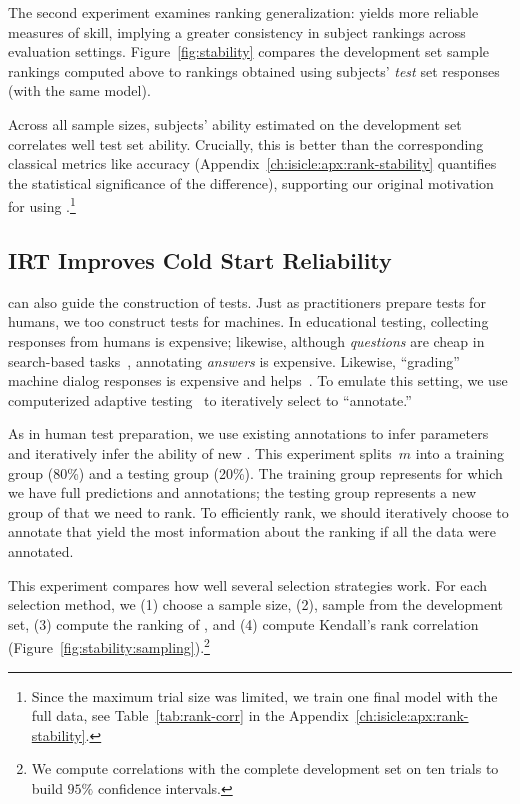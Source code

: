 The second experiment examines ranking generalization: \irt{} yields more reliable measures of \subj{} skill,  implying a greater consistency in subject rankings across evaluation settings.
Figure~\ref{fig:stability} compares the development set sample rankings computed above to rankings obtained using subjects' \emph{test} set responses (with the same \irt{} model).

Across all sample sizes, subjects' \irt{} ability estimated on the
development set correlates well test set ability.
Crucially, this is better than the corresponding classical metrics
like accuracy (Appendix~\ref{ch:isicle:apx:rank-stability} quantifies
the statistical significance of the difference), supporting our
original motivation for using \irt{}.\footnote{ Since the maximum trial size was
    limited, we train one final model with the full data, see
    Table~\ref{tab:rank-corr} in the
    Appendix~\ref{ch:isicle:apx:rank-stability}.  }

\subsection{IRT Improves Cold Start Reliability}
\label{ch:isicle:sampling}

\irt{} can also guide the construction of tests.
Just as \irt{} practitioners prepare tests for humans, we too construct tests for machines.
In educational testing, collecting responses from humans is expensive; likewise, although \emph{questions} are cheap in search-based \qa{} tasks~\citep{Nguyen2016MSMA,kwiatkowski-19}, annotating \emph{answers} is expensive.
Likewise, ``grading'' machine dialog responses is expensive and \irt{} helps~\citep{sedoc2020irt}.
To emulate this setting, we use computerized adaptive testing~\citep{weiss1984cat} to iteratively select \squad{} \itms{} to ``annotate.''

As in human test preparation, we use existing annotations to infer
\itm{} parameters and iteratively infer the ability of new \subjs{}.
This experiment splits~$m$ \subjs{} into a training group (80\%) and a
testing group (20\%).
The training group represents \subjs{} for which we have full \itm{}
predictions and annotations; the testing group represents a new group
of \subjs{} that we need to rank.
To efficiently rank, we should iteratively choose \itms{} to annotate that yield the most information about the ranking if all the data were annotated.

This experiment compares how well several \itm{} selection strategies work.
For each selection method, we (1) choose a sample size, (2), sample
from the development set, (3) compute the ranking of \subjs{}, and (4)
compute Kendall's rank correlation
(Figure~\ref{fig:stability:sampling}).\footnote{We compute correlations with the complete development set on ten trials to build $95\%$ confidence intervals.}


